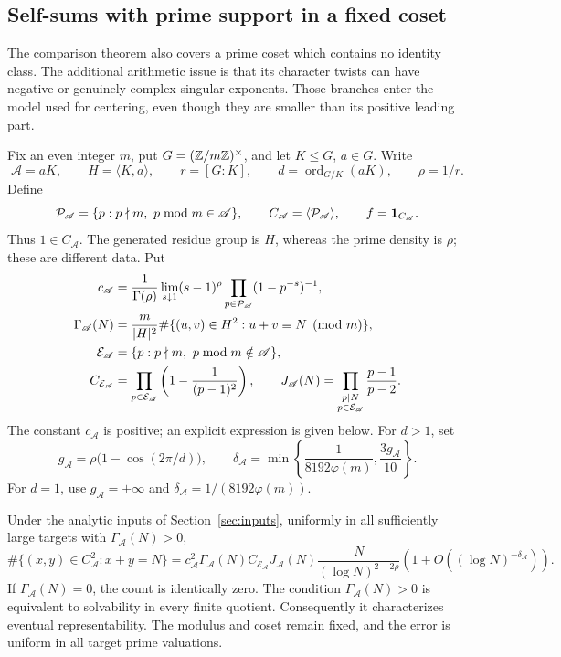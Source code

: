 \subsection{Self-sums with prime support in a fixed coset}\label{sec:cosets}

The comparison theorem also covers a prime coset which contains no
identity class. The additional arithmetic issue is that its character
twists can have negative or genuinely complex singular exponents.
Those branches enter the model used for centering, even though they
are smaller than its positive leading part.

Fix an even integer \(m\), put \(G=(\mathbb Z/m\mathbb Z)^\times\), and let
\(K\le G\), \(a\in G\). Write
\[
 \mathscr A=aK,\qquad H=\langle K,a\rangle,\qquad
 r=[G:K],\qquad d=\operatorname{ord}_{G/K}(aK),\qquad \rho=1/r.
\]
Define
\[
 \mathcal P_{\mathscr A}=\{p:p\nmid m,\ p\bmod m\in\mathscr A\},\qquad
 C_{\mathscr A}=\langle\mathcal P_{\mathscr A}\rangle,\qquad f=\mathbf 1_{C_{\mathscr A}}.
\]
Thus \(1\in C_{\mathscr A}\). The generated residue group is \(H\), whereas
the prime density is \(\rho\); these are different data. Put
\begin{align}
 c_{\mathscr A}&=\frac1{\Gamma(\rho)}\lim_{s\downarrow1}(s-1)^\rho
                        \prod_{p\in\mathcal P_{\mathscr A}}(1-p^{-s})^{-1},
                         \label{eq:coset-marginal}\\
 \Gamma_{\mathscr A}(N)&=\frac{m}{|H|^2}
       \#\{(u,v)\in H^2:u+v\equiv N\pmod m\},\notag\\
 \mathcal E_{\mathscr A}&=\{p:p\nmid m,\ p\bmod m\notin\mathscr A\},\notag\\
 C_{\mathcal E_{\mathscr A}}&=\prod_{p\in\mathcal E_{\mathscr A}}
                 \left(1-\frac1{(p-1)^2}\right),\qquad
 J_{\mathscr A}(N)=\prod_{\substack{p\mid N\\p\in\mathcal E_{\mathscr A}}}
                                      \frac{p-1}{p-2}.\notag
\end{align}
The constant \(c_{\mathscr A}\) is positive; an explicit expression is given below.
For \(d>1\), set
\[
 g_{\mathscr A}=\rho\bigl(1-\cos(2\pi/d)\bigr),\qquad
 \delta_{\mathscr A}=\min\left\{\frac1{8192\varphi(m)},\frac{3g_{\mathscr A}}{10}\right\}.
\]
For \(d=1\), use \(g_{\mathscr A}=+\infty\) and
\(\delta_{\mathscr A}=1/(8192\varphi(m))\).

\begin{theorem}\label{thm:coset}
Under the analytic inputs of Section~\ref{sec:inputs}, uniformly in
all sufficiently large targets with \(\Gamma_{\mathscr A}(N)>0\),
\[
 \#\{(x,y)\in C_{\mathscr A}^2:x+y=N\}
 =c_{\mathscr A}^2\Gamma_{\mathscr A}(N)C_{\mathcal E_{\mathscr A}}J_{\mathscr A}(N)
       \frac{N}{(\log N)^{2-2\rho}}
       \left(1+O((\log N)^{-\delta_{\mathscr A}})\right).
\]
If \(\Gamma_{\mathscr A}(N)=0\), the count is identically zero.
The condition \(\Gamma_{\mathscr A}(N)>0\) is equivalent to solvability in
every finite quotient. Consequently it characterizes eventual
representability. The modulus and coset remain fixed, and the error
is uniform in all target prime valuations.
\end{theorem}

